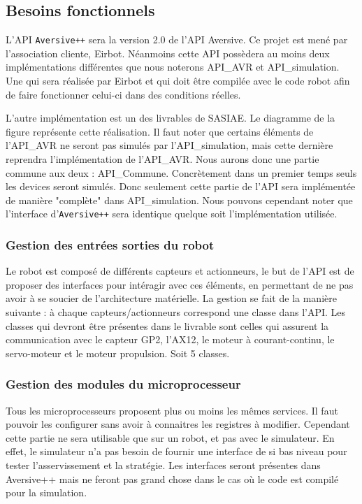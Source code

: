 
\subsection{Besoins fonctionnels}

L'API \texttt{Aversive++} sera la version 2.0 de l'API Aversive. Ce projet est mené par l'association cliente, Eirbot. Néanmoins cette API possèdera au moins deux implémentations différentes que nous noterons API_AVR et API_simulation. Une qui sera réalisée par Eirbot et qui doit être compilée avec le code robot afin de faire fonctionner celui-ci dans des conditions réelles. 

L'autre implémentation est un des livrables de SASIAE. Le diagramme de la figure
représente cette réalisation. Il faut noter que certains éléments de l'API_AVR ne seront pas simulés par l'API_simulation, mais cette dernière reprendra l'implémentation de l'API_AVR. Nous aurons donc une partie commune aux deux : API_Commune. 
Concrètement dans un premier temps seuls les devices seront simulés. Donc seulement cette partie de l'API sera implémentée de manière "complète" dans API_simulation. Nous pouvons cependant noter que l'interface d'\texttt{Aversive++} sera %
identique quelque soit l'implémentation utilisée.

\subsubsection{Gestion des entrées sorties du robot}

Le robot est composé de différents capteurs et actionneurs, le but de l'API est de proposer des interfaces pour intéragir avec ces éléments, en permettant de ne pas avoir à se soucier de l'architecture matérielle. La gestion se fait de la manière suivante : à chaque capteurs/actionneurs correspond une classe dans l'API. Les classes qui devront être présentes dans le livrable sont celles qui assurent la communication avec le capteur GP2, l'AX12, le moteur à courant-continu, le servo-moteur et le moteur propulsion.
Soit 5 classes.

\subsubsection{Gestion des modules du microprocesseur}

Tous les microprocesseurs proposent plus ou moins les mêmes services. Il faut pouvoir les configurer sans avoir à connaitres les registres à modifier. Cependant cette partie ne sera utilisable que sur un robot, et pas avec le simulateur. En effet, le simulateur n'a pas besoin de fournir une interface de si bas niveau pour tester l'asservissement et la stratégie. Les interfaces seront présentes dans Aversive++ mais ne feront pas grand chose dans le cas où le code est compilé pour la simulation.

